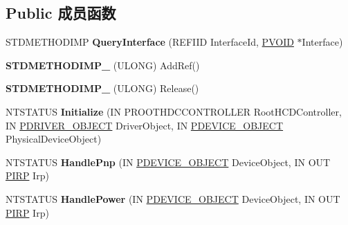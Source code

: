\subsection*{Public 成员函数}
\begin{DoxyCompactItemize}
\item 
\mbox{\label{class_c_h_c_d_controller_a1389166586e5e562ced148fc522ba265}} 
S\+T\+D\+M\+E\+T\+H\+O\+D\+I\+MP {\bfseries Query\+Interface} (R\+E\+F\+I\+ID Interface\+Id, \hyperlink{interfacevoid}{P\+V\+O\+ID} $\ast$Interface)
\item 
\mbox{\label{class_c_h_c_d_controller_a3dbb26a4f403ef29ae4871a2e5941e95}} 
{\bfseries S\+T\+D\+M\+E\+T\+H\+O\+D\+I\+M\+P\+\_\+} (U\+L\+O\+NG) Add\+Ref()
\item 
\mbox{\label{class_c_h_c_d_controller_a90d2b0a5a6e314f675ad58838e0097cb}} 
{\bfseries S\+T\+D\+M\+E\+T\+H\+O\+D\+I\+M\+P\+\_\+} (U\+L\+O\+NG) Release()
\item 
\mbox{\label{class_c_h_c_d_controller_ae11cce3e1d429a9fbd4f691271b98b18}} 
N\+T\+S\+T\+A\+T\+US {\bfseries Initialize} (IN P\+R\+O\+O\+T\+H\+D\+C\+C\+O\+N\+T\+R\+O\+L\+L\+ER Root\+H\+C\+D\+Controller, IN \hyperlink{struct___d_r_i_v_e_r___o_b_j_e_c_t}{P\+D\+R\+I\+V\+E\+R\+\_\+\+O\+B\+J\+E\+CT} Driver\+Object, IN \hyperlink{struct___d_e_v_i_c_e___o_b_j_e_c_t}{P\+D\+E\+V\+I\+C\+E\+\_\+\+O\+B\+J\+E\+CT} Physical\+Device\+Object)
\item 
\mbox{\label{class_c_h_c_d_controller_a028299b0e7bd5b0bdb41ee629ab8e965}} 
N\+T\+S\+T\+A\+T\+US {\bfseries Handle\+Pnp} (IN \hyperlink{struct___d_e_v_i_c_e___o_b_j_e_c_t}{P\+D\+E\+V\+I\+C\+E\+\_\+\+O\+B\+J\+E\+CT} Device\+Object, IN O\+UT \hyperlink{interfacevoid}{P\+I\+RP} Irp)
\item 
\mbox{\label{class_c_h_c_d_controller_a169e3474201a2f2fbdb941ee4757be29}} 
N\+T\+S\+T\+A\+T\+US {\bfseries Handle\+Power} (IN \hyperlink{struct___d_e_v_i_c_e___o_b_j_e_c_t}{P\+D\+E\+V\+I\+C\+E\+\_\+\+O\+B\+J\+E\+CT} Device\+Object, IN O\+UT \hyperlink{interfacevoid}{P\+I\+RP} Irp)
\item 
\mbox{\label{class_c_h_c_d_controller_a54c5fd63b88e7954e937ef6f0f69b265}} 

\end{DoxyCompactItemize}
